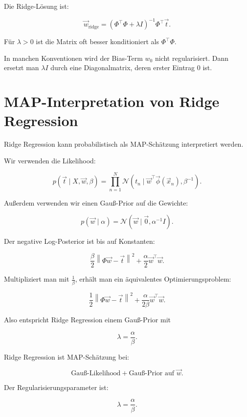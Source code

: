 \begin{conceptbox}
Die Ridge-Lösung ist:

\[
    \vec{w}_{\mathrm{ridge}}
    =
    (\Phi^{\top}\Phi+\lambda I)^{-1}
    \Phi^{\top}\vec{t}.
\]

Für \(\lambda>0\) ist die Matrix oft besser konditioniert als \(\Phi^{\top}\Phi\).
\end{conceptbox}

\begin{notebox}
In manchen Konventionen wird der Bias-Term \(w_0\) nicht regularisiert.
Dann ersetzt man \(\lambda I\) durch eine Diagonalmatrix, deren erster Eintrag \(0\) ist.
\end{notebox}

\section{MAP-Interpretation von Ridge Regression}

Ridge Regression kann probabilistisch als MAP-Schätzung interpretiert werden.

Wir verwenden die Likelihood:

\[
    p(\vec{t}\mid X,\vec{w},\beta)
    =
    \prod_{n=1}^{N}
    \mathcal{N}
    \left(
        t_n
        \mid
        \vec{w}^{\top}\vec{\phi}(\vec{x}_n),
        \beta^{-1}
    \right).
\]

Außerdem verwenden wir einen Gauß-Prior auf die Gewichte:

\[
    p(\vec{w}\mid\alpha)
    =
    \mathcal{N}
    \left(
        \vec{w}
        \mid
        \vec{0},
        \alpha^{-1}I
    \right).
\]

Der negative Log-Posterior ist bis auf Konstanten:

\[
    \frac{\beta}{2}
    \left\|
        \Phi\vec{w}-\vec{t}
    \right\|^2
    +
    \frac{\alpha}{2}
    \vec{w}^{\top}\vec{w}.
\]

Multipliziert man mit \(\frac{1}{\beta}\), erhält man ein äquivalentes Optimierungsproblem:

\[
    \frac{1}{2}
    \left\|
        \Phi\vec{w}-\vec{t}
    \right\|^2
    +
    \frac{\alpha}{2\beta}
    \vec{w}^{\top}\vec{w}.
\]

Also entspricht Ridge Regression einem Gauß-Prior mit

\[
    \lambda
    =
    \frac{\alpha}{\beta}.
\]

\begin{conceptbox}
Ridge Regression ist MAP-Schätzung bei:

\[
    \text{Gauß-Likelihood}
    +
    \text{Gauß-Prior auf } \vec{w}.
\]

Der Regularisierungsparameter ist:

\[
    \lambda
    =
    \frac{\alpha}{\beta}.
\]
\end{conceptbox}


